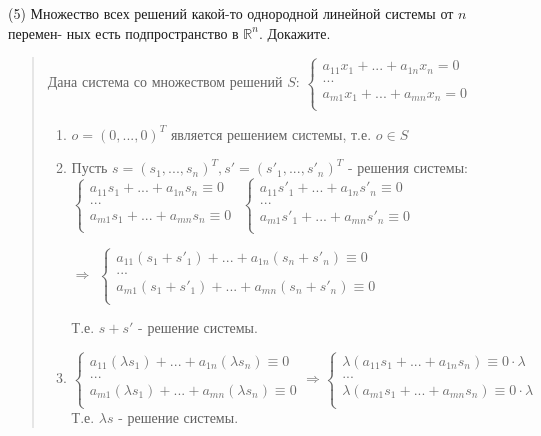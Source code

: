 \documentclass{article}
\begin{document}
(5) Множество всех решений какой-то однородной линейной системы от $n$ перемен- ных есть подпространство в $\mathbb{R}^n$. Докажите. 
\begin{quote}
    Дана система со множеством решений $S$: $\begin{cases}
        a_{11}x_1 + ... + a_{1n}x_n = 0 \\
        ... \\
        a_{m1}x_1 + ... + a_{mn}x_n = 0 \\
    \end{cases}$
    
    \begin{enumerate}
        \item $o = (0, ..., 0)^T$ является решением системы, т.е. $o \in S$
        \item Пусть $s = (s_1, ..., s_n)^T, s' = (s'_1, ..., s'_n)^T$ - решения системы:\\
        $
        \begin{cases}
        a_{11}s_1 + ... + a_{1n}s_n \equiv 0 \\
        ... \\
        a_{m1}s_1 + ... + a_{mn}s_n \equiv 0 \\
        \end{cases}
        $
        $
        \begin{cases}
        a_{11}s'_1 + ... + a_{1n}s'_n \equiv 0 \\
        ... \\
        a_{m1}s'_1 + ... + a_{mn}s'_n \equiv 0 \\
        \end{cases}
        $
        
        $\Rightarrow$
        $
        \begin{cases}
        a_{11}(s_1 + s'_1) + ... + a_{1n}(s_n + s'_n) \equiv 0 \\
        ... \\
        a_{m1}(s_1 + s'_1) + ... + a_{mn}(s_n + s'_n) \equiv 0 \\
        \end{cases}
        $

        Т.е. $s + s'$ - решение системы.

        \item 
        $
        \begin{cases}
        a_{11}(\lambda s_1) + ... + a_{1n}(\lambda s_n) \equiv 0 \\
        ... \\
        a_{m1}(\lambda s_1) + ... + a_{mn}(\lambda s_n) \equiv 0 \\
        \end{cases}
        \Rightarrow 
        \begin{cases}
        \lambda(a_{11}s_1 + ... + a_{1n}s_n) \equiv 0 \cdot \lambda \\
        ... \\
        \lambda(a_{m1}s_1 + ... + a_{mn}s_n) \equiv 0 \cdot \lambda \\
        \end{cases}
        $
        Т.е. $\lambda s$ - решение системы.
    \end{enumerate}
\end{quote}
\end{document}
